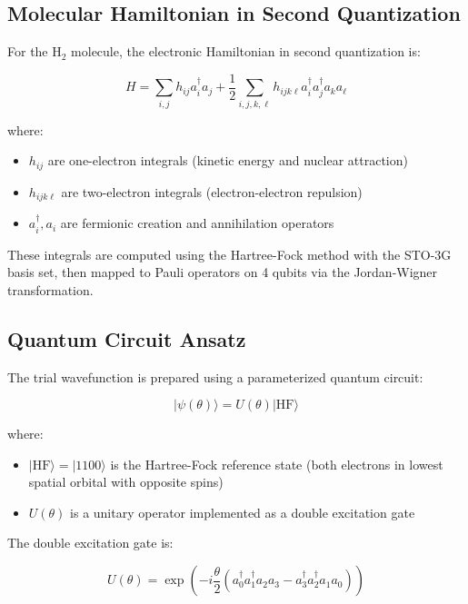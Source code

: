 \documentclass[11pt]{article}
\begin{document}
\subsection{Molecular Hamiltonian in Second Quantization}

For the H$_2$ molecule, the electronic Hamiltonian in second quantization is:

\begin{equation}
    H = \sum_{i,j} h_{ij} a_i^\dagger a_j + \frac{1}{2}\sum_{i,j,k,\ell} h_{ij k\ell} a_i^\dagger a_j^\dagger a_k a_\ell
\end{equation}

where:
\begin{itemize}
    \item $h_{ij}$ are one-electron integrals (kinetic energy and nuclear attraction)
    \item $h_{ij k\ell}$ are two-electron integrals (electron-electron repulsion)
    \item $a_i^\dagger, a_i$ are fermionic creation and annihilation operators
\end{itemize}

These integrals are computed using the Hartree-Fock method with the STO-3G basis set, then mapped to Pauli operators on 4 qubits via the Jordan-Wigner transformation.

\subsection{Quantum Circuit Ansatz}

The trial wavefunction is prepared using a parameterized quantum circuit:

\begin{equation}
    |\psi(\theta)\rangle = U(\theta) |\text{HF}\rangle
\end{equation}

where:
\begin{itemize}
    \item $|\text{HF}\rangle = |1100\rangle$ is the Hartree-Fock reference state (both electrons in lowest spatial orbital with opposite spins)
    \item $U(\theta)$ is a unitary operator implemented as a double excitation gate
\end{itemize}

The double excitation gate is:

\begin{equation}
    U(\theta) = \exp\left(-i\frac{\theta}{2}(a_0^\dagger a_1^\dagger a_2 a_3 - a_3^\dagger a_2^\dagger a_1 a_0)\right)
\end{equation}
\end{document}
